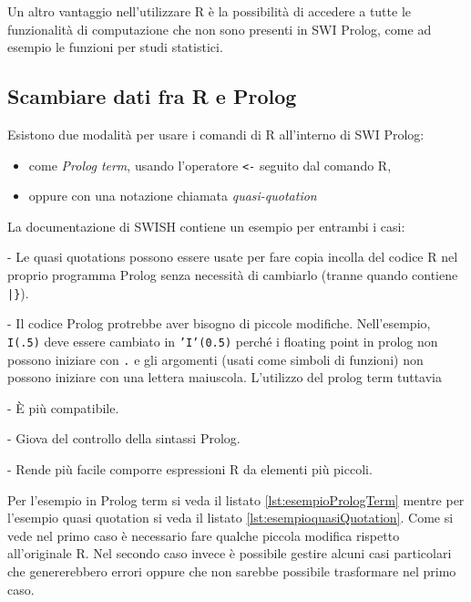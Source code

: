 \documentclass[10pt,titlepage,twoside,a4paper]{report}
\begin{document}
Un altro vantaggio nell'utilizzare R è la possibilità di accedere a tutte le 
funzionalità di computazione che non sono presenti in SWI Prolog, come ad 
esempio le funzioni per studi statistici.
 
\subsection{Scambiare dati fra R e Prolog}
Esistono due modalità per usare i comandi di R all'interno di SWI Prolog:
\begin{itemize}
    \item come \emph{Prolog term}, usando l'operatore \texttt{<-} 
seguito dal comando R,
    \item oppure con una notazione chiamata \emph{quasi-quotation}
\end{itemize}
La documentazione di SWISH contiene un esempio per entrambi i 
casi\cite{rprolognotations}:
\begin{displayquote}
- Le quasi quotations possono essere usate per fare copia incolla del codice R 
nel proprio programma Prolog senza necessità di cambiarlo (tranne quando 
contiene \texttt{|\}}).

- Il codice Prolog protrebbe aver bisogno di piccole modifiche. Nell'esempio,
  \texttt{I(.5)} deve essere cambiato in \texttt{'I'(0.5)} perché 
  i floating point in prolog non possono iniziare con \texttt{.} e gli 
  argomenti (usati come simboli di funzioni) non possono iniziare con una lettera 
  maiuscola. L'utilizzo del prolog term tuttavia

    - È più compatibile.

    - Giova del controllo della sintassi Prolog.

    - Rende più facile comporre espressioni R da elementi più piccoli.
\end{displayquote}
Per l'esempio in Prolog term si veda il listato \ref{lst:esempioPrologTerm}
mentre per l'esempio quasi quotation si veda il 
listato \ref{lst:esempioquasiQuotation}.
Come si vede nel primo caso è necessario fare qualche piccola modifica 
rispetto all'originale R. Nel secondo caso invece è possibile gestire alcuni 
casi particolari che genererebbero errori oppure che non sarebbe possibile 
trasformare nel primo caso.
\end{document}
